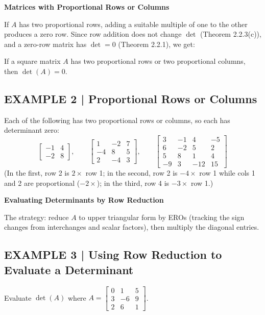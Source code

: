 \documentclass{article}
\newcommand{\redheading}[1]{{\vspace{2mm}\noindent\Large\bfseries\color{red!55!black} #1\par}\vspace{2mm}}
\theoremstyle{mystyle}
\begin{document}
\redheading{Matrices with Proportional Rows or Columns}

If $A$ has two proportional rows, adding a suitable multiple of one to the other produces a zero row. Since row addition does not change $\det$ (Theorem 2.2.3(c)), and a zero-row matrix has $\det=0$ (Theorem 2.2.1), we get:

\begin{tcolorbox}[colback=red!4, colframe=red!60!black,
  title={\textbf{Theorem 2.2.5}}, boxrule=0.5mm, arc=3mm]
If a square matrix $A$ has two proportional rows or two proportional columns, then $\det(A)=0$.
\end{tcolorbox}

\subsection*{EXAMPLE 2 | Proportional Rows or Columns}

Each of the following has two proportional rows or columns, so each has determinant zero:
\[
\begin{bmatrix}-1&4\\-2&8\end{bmatrix},\qquad
\begin{bmatrix}1&-2&7\\-4&8&5\\2&-4&3\end{bmatrix},\qquad
\begin{bmatrix}3&-1&4&-5\\6&-2&5&2\\5&8&1&4\\-9&3&-12&15\end{bmatrix}
\]
(In the first, row 2 is $2\times$ row 1; in the second, row 2 is $-4\times$ row 1 while cols 1 and 2 are proportional ($-2\times$); in the third, row 4 is $-3\times$ row 1.)

\redheading{Evaluating Determinants by Row Reduction}

The strategy: reduce $A$ to upper triangular form by EROs (tracking the sign changes from interchanges and scalar factors), then multiply the diagonal entries.

\subsection*{EXAMPLE 3 | Using Row Reduction to Evaluate a Determinant}
Evaluate $\det(A)$ where $A=\begin{bmatrix}0&1&5\\3&-6&9\\2&6&1\end{bmatrix}$.
\end{document}

